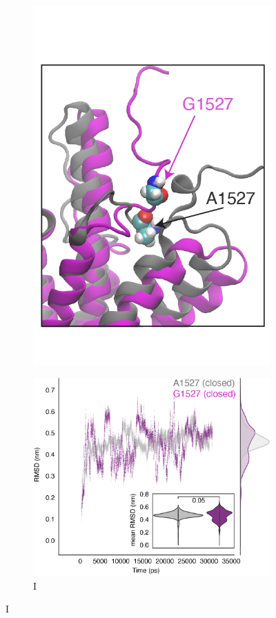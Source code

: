 \begin{figure}[H]
\begin{subfigure}[t]{0.165\textwidth}
        \includegraphics[width=\textwidth]{./main_plots/abca7_inset_only.png}        
    \end{subfigure}
    \hspace{0.01\textwidth} %
    \begin{subfigure}[t]{0.32\textwidth}
        \caption{I}
        \includegraphics[width=\textwidth]{./main_plots/variant_dynamics.png}        

\end{subfigure}
\end{figure}
